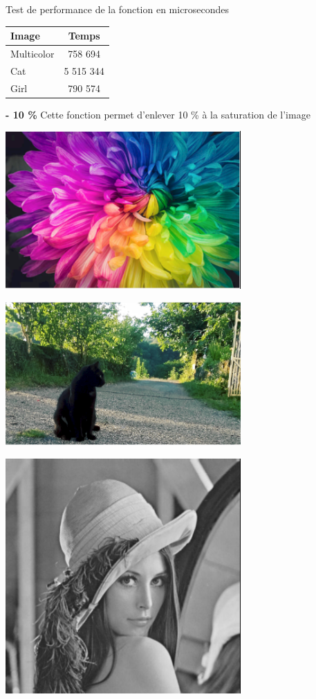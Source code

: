 \documentclass{article}
\begin{document}
\begin{center}
\medbreak
Test de performance de la fonction en microsecondes
\bigbreak
   \begin{tabular}{ | l | c | }
     \hline
     Image & Temps \\
     \hline
     Multicolor & 758 694 \\
     \hline
     Cat & 5 515 344 \\
     \hline
     Girl & 790 574 \\
     \hline
   \end{tabular}
 \end{center}
\bigbreak

\textbf{- 10 \%}
Cette fonction permet d'enlever 10 \% à la saturation de l'image

\begin{center} 
    \includegraphics[width=9cm]{../Image_fonctions/Multicolor/Saturation-1.PNG}
\end{center}
\begin{center} 
    \includegraphics[width=9cm]{../Image_fonctions/Cat/Saturation-1.PNG}
\end{center}
\begin{center} 
    \includegraphics[width=9cm]{../Image_fonctions/Lenna/Saturation-1.PNG}
\end{center}
\end{document}

